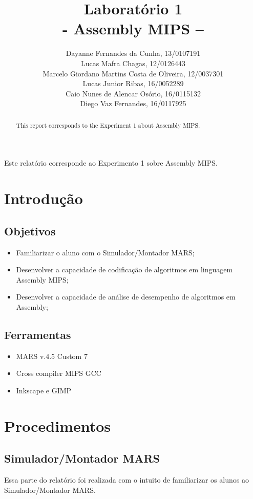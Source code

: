 \documentclass[12pt]{article}
\title{Laboratório 1\\- Assembly MIPS –}
\author{Dayanne Fernandes da Cunha, 13/0107191\\
  Lucas Mafra Chagas, 12/0126443\\
  Marcelo Giordano Martins Costa de Oliveira, 12/0037301\\
  Lucas Junior Ribas, 16/0052289\\
  Caio Nunes de Alencar Osório, 16/0115132\\
  Diego Vaz Fernandes, 16/0117925}
\begin{document}
\maketitle

 \begin{abstract}
	This report corresponds to the Experiment 1 about Assembly MIPS.
 \end{abstract}
 \begin{resumo}
	Este relatório corresponde ao Experimento 1 sobre Assembly MIPS.
 \end{resumo}

\section{Introdução}
\label{sec:Introducao}

\subsection{Objetivos}
\label{sec:Objetivos}

\begin{itemize}
\item Familiarizar o aluno com o Simulador/Montador MARS;
\item Desenvolver a capacidade de codificação de algoritmos em linguagem Assembly MIPS;
\item Desenvolver a capacidade de análise de desempenho de algoritmos em Assembly;
\end{itemize}

\subsection{Ferramentas}
\label{sec:Materiais}

\begin{itemize}
\item MARS v.4.5 Custom 7
\item Cross compiler MIPS GCC
\item Inkscape e GIMP
\end{itemize}

\section{Procedimentos}
\label{sec:Procedimentos}

\subsection{Simulador/Montador MARS}
\label{subsec:mars}
Essa parte do relatório foi realizada com o intuito de familiarizar os alunos ao Simulador/Montador MARS.
\end{document}
